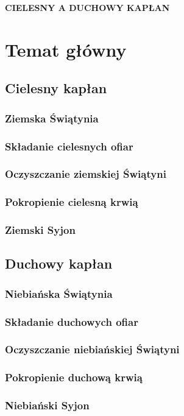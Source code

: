 \documentclass[10pt,a4paper,oneside]{article}
\begin{document}
\centerline{\textbf{\MakeUppercase{Cielesny a duchowy kapłan}}}

\section{Temat główny}
\subsection{Cielesny kapłan}
\subsubsection{Ziemska Świątynia}
\subsubsection{Składanie cielesnych ofiar}
\subsubsection{Oczyszczanie ziemskiej Świątyni}
\subsubsection{Pokropienie cielesną krwią}
\subsubsection{Ziemski Syjon}
\subsection{Duchowy kapłan}
\subsubsection{Niebiańska Świątynia}
\subsubsection{Składanie duchowych ofiar}
\subsubsection{Oczyszczanie niebiańskiej Świątyni}
\subsubsection{Pokropienie duchową krwią}
\subsubsection{Niebiański Syjon}
\end{document}
